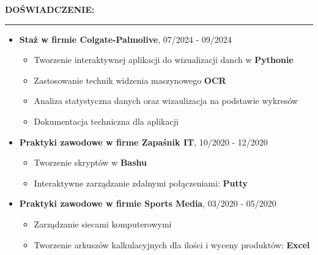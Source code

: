 \documentclass[10pt]{article}
\newcommand{\longline}{\rule{19.6cm}{1pt}}
\begin{document}
\noindent \fontsize{14pt}{14pt}\selectfont \textbf{\color{Violet}DOŚWIADCZENIE:}
\fontsize{10pt}{10pt}\selectfont

\noindent \longline 
\begin{itemize}[leftmargin=*]
    \item \textbf{Staż w firmie Colgate-Palmolive}, 07/2024 - 09/2024
    \begin{itemize}
        \item Tworzenie interaktywnej aplikacji do wizualizacji danch w \textbf{Pythonie}
        \item Zastosowanie technik widzenia maszynowego \textbf{OCR} 
        \item Analiza statystyczna danych oraz wizaulizacja na podstawie wykresów
        \item Dokumentacja techniczna dla aplikacji
    \end{itemize}
    \item \textbf{Praktyki zawodowe w firme Zapaśnik IT}, 10/2020 - 12/2020
    \begin{itemize}
        \item Tworzenie skryptów w \textbf{Bashu} 
        \item Interaktywne zarządzanie zdalnymi połączeniami: \textbf{Putty}
    \end{itemize}
    \item \textbf{Praktyki zawodowe w firmie Sports Media}, 03/2020 - 05/2020
    \begin{itemize}
        \item Zarządzanie siecami komputerowymi
        \item Tworzenie arkuszów kalkulacyjnych dla ilości i wyceny produktów: \textbf{Excel}
    \end{itemize}
\end{itemize}
\end{document}
